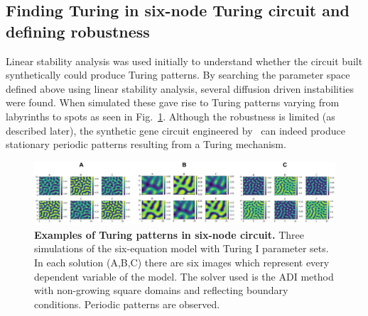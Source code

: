 \subsection{Finding Turing in six-node Turing circuit and defining robustness}
Linear stability analysis was used initially to understand whether the circuit built synthetically could produce Turing patterns.
By searching the parameter space defined above using linear stability analysis,
several diffusion driven instabilities were found.
When simulated these gave rise to Turing patterns
varying from labyrinths to spots as seen in Fig.~\ref{fig:square_turing}.
Although the robustness is limited (as described later),
the synthetic gene circuit engineered by~\cite{Tica2020} can indeed produce stationary periodic patterns
resulting from a Turing mechanism.

\begin{figure}[H]
    \centering
    \includegraphics[width=1\textwidth]{chapters/Chapter 2/square_turing}
    \caption{\textbf{Examples of Turing patterns in six-node circuit.} Three simulations of the six-equation model with Turing I parameter sets.
    In each solution (A,B,C) there are six images which represent every dependent variable of the model.
    The solver used is the \acrfull{ADI} method with non-growing square domains and reflecting boundary conditions.
    Periodic patterns are observed.}
    \label{fig:square_turing}
\end{figure}

